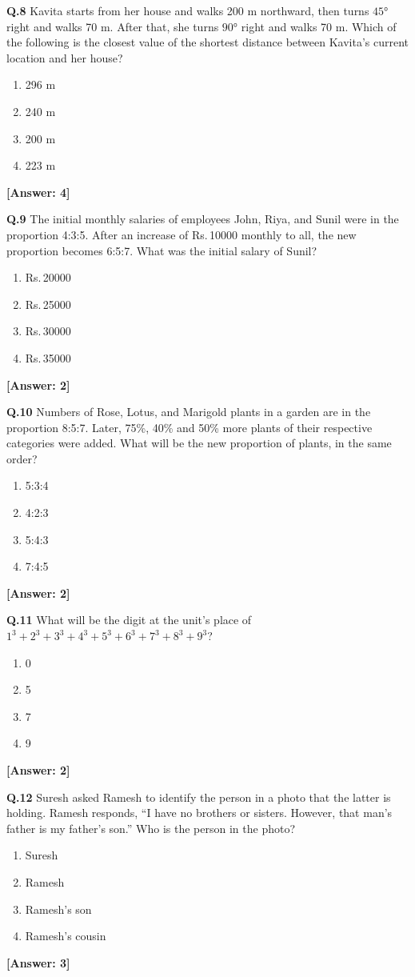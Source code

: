 \documentclass[12pt,a4paper]{article}
\newcommand{\ans}[1]{\quad\textcolor{anscolor}{\textbf{[Answer: #1]}}}
\begin{document}
\textbf{Q.8} Kavita starts from her house and walks 200 m northward, then turns $45°$ right and walks 70 m. After that, she turns $90°$ right and walks 70 m. Which of the following is the closest value of the shortest distance between Kavita's current location and her house?
\begin{enumerate}[label=\arabic*.]
\item 296 m \item 240 m \item 200 m \item 223 m
\end{enumerate}\ans{4}

\textbf{Q.9} The initial monthly salaries of employees John, Riya, and Sunil were in the proportion 4:3:5. After an increase of Rs.\,10000 monthly to all, the new proportion becomes 6:5:7. What was the initial salary of Sunil?
\begin{enumerate}[label=\arabic*.]
\item Rs.\,20000 \item Rs.\,25000 \item Rs.\,30000 \item Rs.\,35000
\end{enumerate}\ans{2}

\textbf{Q.10} Numbers of Rose, Lotus, and Marigold plants in a garden are in the proportion 8:5:7. Later, 75\%, 40\% and 50\% more plants of their respective categories were added. What will be the new proportion of plants, in the same order?
\begin{enumerate}[label=\arabic*.]
\item 5:3:4 \item 4:2:3 \item 5:4:3 \item 7:4:5
\end{enumerate}\ans{2}

\textbf{Q.11} What will be the digit at the unit's place of $1^3+2^3+3^3+4^3+5^3+6^3+7^3+8^3+9^3$?
\begin{enumerate}[label=\arabic*.]
\item 0 \item 5 \item 7 \item 9
\end{enumerate}\ans{2}

\textbf{Q.12} Suresh asked Ramesh to identify the person in a photo that the latter is holding. Ramesh responds, ``I have no brothers or sisters. However, that man's father is my father's son.'' Who is the person in the photo?
\begin{enumerate}[label=\arabic*.]
\item Suresh \item Ramesh \item Ramesh's son \item Ramesh's cousin
\end{enumerate}\ans{3}
\end{document}
